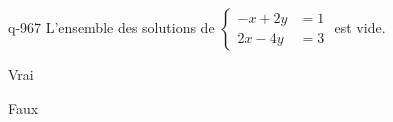 \begin{truefalse}{q-967}
L'ensemble des solutions de $\begin{cases} -x+2y &= 1 \\ 2x-4y &= 3 \end{cases}$ est vide.
\item* Vrai
\item Faux
\end{truefalse}

